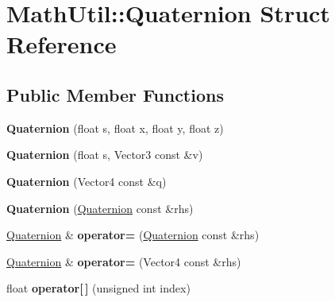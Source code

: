 \hypertarget{structMathUtil_1_1Quaternion}{}\section{Math\+Util\+:\+:Quaternion Struct Reference}
\label{structMathUtil_1_1Quaternion}
\subsection*{Public Member Functions}
\begin{DoxyCompactItemize}
\item 
\mbox{\label{structMathUtil_1_1Quaternion_a3142498176c3a32c1fca7d257ec68cb1}} 
{\bfseries Quaternion} (float s, float x, float y, float z)
\item 
\mbox{\label{structMathUtil_1_1Quaternion_a37a9999111f098a39f745ef55df73573}} 
{\bfseries Quaternion} (float s, Vector3 const \&v)
\item 
\mbox{\label{structMathUtil_1_1Quaternion_a37216d9a4beb2dbe5a077aeba11bfca2}} 
{\bfseries Quaternion} (Vector4 const \&q)
\item 
\mbox{\label{structMathUtil_1_1Quaternion_ab8a51bd860dc7c4d007aa0b87861c948}} 
{\bfseries Quaternion} (\hyperlink{structMathUtil_1_1Quaternion}{Quaternion} const \&rhs)
\item 
\mbox{\label{structMathUtil_1_1Quaternion_a0db72410da8c9e488a6b32694d2e56df}} 
\hyperlink{structMathUtil_1_1Quaternion}{Quaternion} \& {\bfseries operator=} (\hyperlink{structMathUtil_1_1Quaternion}{Quaternion} const \&rhs)
\item 
\mbox{\label{structMathUtil_1_1Quaternion_a1267584036a5e73bcc1b72bdee59861a}} 
\hyperlink{structMathUtil_1_1Quaternion}{Quaternion} \& {\bfseries operator=} (Vector4 const \&rhs)
\item 
\mbox{\label{structMathUtil_1_1Quaternion_a501426c95a2a54a1cbc9cb5a7da17e70}} 
float {\bfseries operator\mbox{[}$\,$\mbox{]}} (unsigned int index)
\item 

\end{DoxyCompactItemize}

